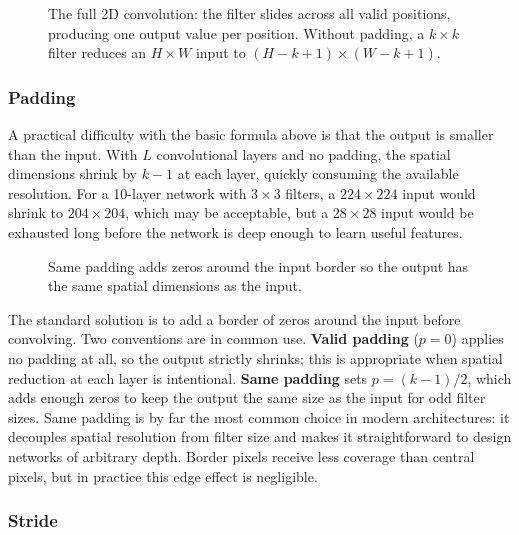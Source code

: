 \begin{figure}[h]
    \centering
    \resizebox{0.75\textwidth}{!}{}
    \caption{The full 2D convolution: the filter slides across all valid positions, producing one output value per position. Without padding, a $k\times k$ filter reduces an $H\times W$ input to $(H-k+1)\times(W-k+1)$.}
    \label{fig:conv2d_steps}
\end{figure}


\subsubsection{Padding}

A practical difficulty with the basic formula above is that the output is smaller than the input. With $L$ convolutional layers and no padding, the spatial dimensions shrink by $k - 1$ at each layer, quickly consuming the available resolution. For a 10-layer network with $3 \times 3$ filters, a $224 \times 224$ input would shrink to $204 \times 204$, which may be acceptable, but a $28 \times 28$ input would be exhausted long before the network is deep enough to learn useful features.

\begin{figure}
    \centering
    \resizebox{0.40\textwidth}{!}{}
    \caption{Same padding adds zeros around the input border so the output has the same spatial dimensions as the input.}
    \label{fig:padding}
\end{figure}

The standard solution is to add a border of zeros around the input before convolving. Two conventions are in common use. \textbf{Valid padding} ($p = 0$) applies no padding at all, so the output strictly shrinks; this is appropriate when spatial reduction at each layer is intentional. \textbf{Same padding} sets $p = (k-1)/2$, which adds enough zeros to keep the output the same size as the input for odd filter sizes. Same padding is by far the most common choice in modern architectures: it decouples spatial resolution from filter size and makes it straightforward to design networks of arbitrary depth. Border pixels receive less coverage than central pixels, but in practice this edge effect is negligible.

\subsubsection{Stride}


